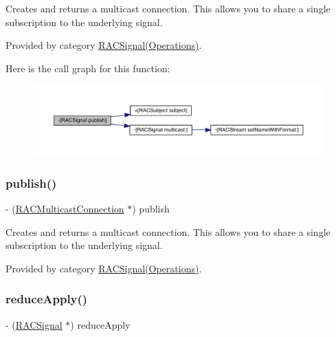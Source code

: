 Creates and returns a multicast connection. This allows you to share a single subscription to the underlying signal. 

Provided by category \mbox{\hyperlink{category_r_a_c_signal_07_operations_08_a16f260eea2cfd9a3953b95926d442a93}{R\+A\+C\+Signal(\+Operations)}}.

Here is the call graph for this function\+:\nopagebreak
\begin{figure}[H]
\begin{center}
\leavevmode
\includegraphics[width=350pt]{interface_r_a_c_signal_a16f260eea2cfd9a3953b95926d442a93_cgraph}
\end{center}
\end{figure}
\mbox{\label{interface_r_a_c_signal_a16f260eea2cfd9a3953b95926d442a93}} 
\subsubsection{\texorpdfstring{publish()}{publish()}\hspace{0.1cm}{\footnotesize\ttfamily [3/3]}}
{\footnotesize\ttfamily -\/ (\mbox{\hyperlink{interface_r_a_c_multicast_connection}{R\+A\+C\+Multicast\+Connection}} $\ast$) publish \begin{DoxyParamCaption}{ }\end{DoxyParamCaption}}

Creates and returns a multicast connection. This allows you to share a single subscription to the underlying signal. 

Provided by category \mbox{\hyperlink{category_r_a_c_signal_07_operations_08_a16f260eea2cfd9a3953b95926d442a93}{R\+A\+C\+Signal(\+Operations)}}.

\mbox{\label{interface_r_a_c_signal_a60241be15dba6de172d2ab14be09b657}} 
\subsubsection{\texorpdfstring{reduce\+Apply()}{reduceApply()}\hspace{0.1cm}{\footnotesize\ttfamily [1/3]}}
{\footnotesize\ttfamily -\/ (\mbox{\hyperlink{interface_r_a_c_signal}{R\+A\+C\+Signal}} $\ast$) reduce\+Apply \begin{DoxyParamCaption}{ }\end{DoxyParamCaption}}


